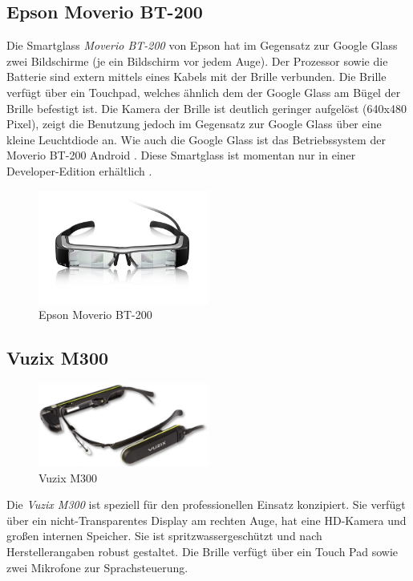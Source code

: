 \subsection{Epson Moverio BT-200}
\label{sec:Epson_Moverio_BT-200}
Die Smartglass \emph{Moverio BT-200} von Epson hat im Gegensatz zur Google Glass zwei Bildschirme (je ein Bildschirm vor jedem Auge). Der Prozessor sowie die Batterie sind extern mittels eines Kabels mit der Brille verbunden. Die Brille verfügt über ein Touchpad, welches ähnlich dem der Google Glass am Bügel der Brille befestigt ist. Die Kamera der Brille ist deutlich geringer aufgelöst (640x480 Pixel), zeigt die Benutzung jedoch im Gegensatz zur Google Glass über eine kleine Leuchtdiode an. Wie auch die Google Glass ist das Betriebssystem der Moverio BT-200 Android \cite[S.~32]{Schwenke2016}. Diese Smartglass ist momentan nur in einer Developer-Edition erhältlich \cite{Epson}.
%
\begin{figure}[htbp]
    \centering
    \includegraphics[width=0.5\textwidth]{data/bilder/Moverio_BT-200.png}
    \caption{Epson Moverio BT-200 \cite{Epson}}
    \label{fig:BT-200}
\end{figure}
%
%
\subsection{Vuzix M300}
%
\begin{figure}[htbp]
    \centering
    \includegraphics[width=0.5\textwidth]{data/bilder/m300-top.png}
    \caption{Vuzix M300 \cite{Vuzix2018}}
    \label{fig:hmt1}
\end{figure}
%
Die \emph{Vuzix M300} ist speziell für den professionellen Einsatz konzipiert. Sie verfügt über ein nicht-Transparentes Display am rechten Auge, hat eine HD-Kamera und großen internen Speicher. Sie ist spritzwassergeschützt und nach Herstellerangaben robust gestaltet. Die Brille verfügt über ein Touch Pad sowie zwei Mikrofone zur Sprachsteuerung. 

